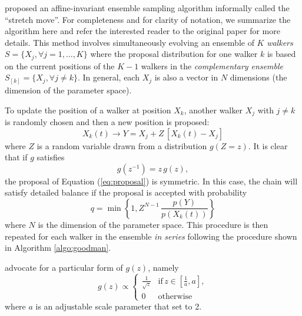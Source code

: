 \documentclass[12pt,preprint]{aastex}
\newcommand{\eq}[1]{Equation (\ref{eq:#1})}
\newcommand{\eqlabel}[1]{\label{eq:#1}}
\newcommand{\algo}[1]{Algorithm \ref{algo:#1}}
\newcommand{\ensemble}{S}
\renewcommand{\vector}[1]{#1}
\newcommand{\pr}[1]{\ensuremath{p(#1)}}
\begin{document}
 proposed an affine-invariant ensemble sampling
algorithm informally called the ``stretch move''. For completeness and for
clarity of notation, we summarize the algorithm here and refer the interested
reader to the original paper for more details. This method involves
simultaneously evolving an ensemble of $K$ \emph{walkers}
$\ensemble = \{ \vector{X_j}, \forall j=1,\ldots,K \}$ where the proposal
distribution for one walker $k$ is based on the current positions of the
$K-1$ walkers in the \emph{complementary ensemble}
$\ensemble_{[k]} = \{ \vector{X_j}, \forall j \ne k \}$. In general, each
$\vector{X_j}$ is also a vector in $N$ dimensions (the dimension
of the parameter space).

To update the position of a walker at position $\vector{X_k}$,
another walker $\vector{X_j}$ with $j \ne k$ is randomly chosen and then
a new position is proposed:
\begin{equation}
    \eqlabel{proposal}
    \vector{X_k} (t) \to \vector{Y} = \vector{X_j}
            + Z \, [\vector{X_k} (t) - \vector{X_j}]
\end{equation}
where $Z$ is a random variable drawn from a distribution $g(Z = z)$.
It is clear that if $g$ satisfies
\begin{equation}
    g(z^{-1}) = z \, g(z),
\end{equation}
the proposal of \eq{proposal} is symmetric. In this case, the chain will
satisfy detailed balance if the proposal is accepted with probability
\begin{equation}
    \eqlabel{acceptance}
    q = \min \left \{ 1, Z^{N-1} \,
                \frac{\pr{\vector{Y}}}{\pr{\vector{X_k} (t)}} \right \}
\end{equation}
where $N$ is the dimension of the parameter space. This procedure is then
repeated for each walker in the ensemble \emph{in series} following the
procedure shown in \algo{goodman}.

 advocate for a particular form of $g(z)$, namely
\begin{equation}
    \eqlabel{goodmanprop}
    g(z) \propto \left \{ \begin{array}{ll}
        \displaystyle\frac{1}{\sqrt{z}} & \mathrm{if}\, z\in
                        \left [ \displaystyle\frac{1}{a}, a \right ], \\
        0 & \mathrm{otherwise}
    \end{array} \right .
\end{equation}
where $a$ is an adjustable scale parameter that  set
to 2.
\end{document}
